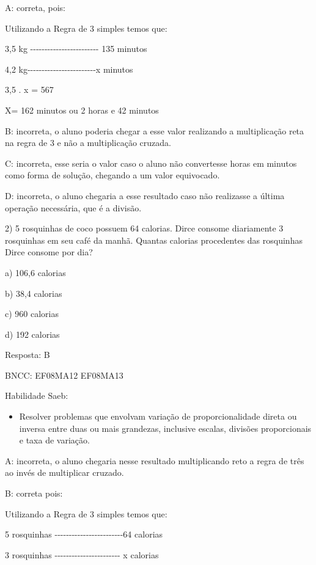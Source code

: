 A: correta, pois:

Utilizando a Regra de 3 simples temos que:

3,5 kg
-\/-\/-\/-\/-\/-\/-\/-\/-\/-\/-\/-\/-\/-\/-\/-\/-\/-\/-\/-\/-\/-\/-\/-
135 minutos

4,2
kg-\/-\/-\/-\/-\/-\/-\/-\/-\/-\/-\/-\/-\/-\/-\/-\/-\/-\/-\/-\/-\/-\/-\/-x
minutos

3,5 . x = 567

X= 162 minutos ou 2 horas e 42 minutos

B: incorreta, o aluno poderia chegar a esse valor realizando a
multiplicação reta na regra de 3 e não a multiplicação cruzada.

C: incorreta, esse seria o valor caso o aluno não convertesse horas em
minutos como forma de solução, chegando a um valor equivocado.

D: incorreta, o aluno chegaria a esse resultado caso não realizasse a
última operação necessária, que é a divisão.

2) 5 rosquinhas de coco possuem 64 calorias. Dirce consome diariamente 3
rosquinhas em seu café da manhã. Quantas calorias procedentes das
rosquinhas Dirce consome por dia?

a) 106,6 calorias

b) 38,4 calorias

c) 960 calorias

d) 192 calorias

Resposta: B

BNCC: EF08MA12 EF08MA13

Habilidade Saeb:

\begin{itemize}
\tightlist
\item
  Resolver problemas que envolvam variação de proporcionalidade direta
  ou inversa entre duas ou mais grandezas, inclusive escalas, divisões
  proporcionais e taxa de variação.
\end{itemize}

A: incorreta, o aluno chegaria nesse resultado multiplicando reto a
regra de três ao invés de multiplicar cruzado.

B: correta pois:

Utilizando a Regra de 3 simples temos que:

5 rosquinhas
-\/-\/-\/-\/-\/-\/-\/-\/-\/-\/-\/-\/-\/-\/-\/-\/-\/-\/-\/-\/-\/-\/-\/-64
calorias

3 rosquinhas
-\/-\/-\/-\/-\/-\/-\/-\/-\/-\/-\/-\/-\/-\/-\/-\/-\/-\/-\/-\/-\/-\/- x
calorias

